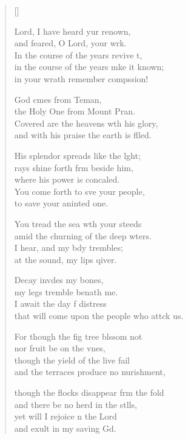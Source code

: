 \settowidth{\versewidth}{that will come upon the people who attack us.}
\begin{verse}[\versewidth]
  \begin{patverse}
 Lord, I have heard yur renown,\Med\\
and feared, O Lord, your wrk.\\
In the course of the years revive \pointup{\i}t,\Flex\\
in the course of the years mke it known;\Med\\
in your wrath remember compssion!

God cmes from Teman,\Med\\
the Holy One from Mount Pran.\\
Covered are the heavens w\pointup{\i}th his glory,\Med\\
and with his praise the earth is f\pointup{\i}lled.

His splendor spreads like the l\pointup{\i}ght;\Flex\\
rays shine forth frm beside him,\Med\\
where his power is concaled.\\
You come forth to sve your people,\Med\\
to save your aninted one.

You tread the sea w\pointup{\i}th your steeds\Med\\
amid the churning of the deep wters.\\
I hear, and my bdy trembles;\Med\\
at the sound, my lips qiver.

Decay invdes my bones,\Med\\
my legs tremble benath me.\\
I await the day f distress\Med\\
that will come upon the people who attck us.

For though the fig tree blssom not\Med\\
nor fruit be on the v\pointup{\i}nes,\\
though the yield of the live fail\Med\\
and the terraces produce no nurishment,

though the flocks disappear frm the fold\Med\\
and there be no herd in the stlls,\\
yet will I rejoice \pointup{\i}n the Lord\Med\\
and exult in my saving Gd.


\end{patverse}
\end{verse}
